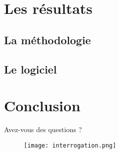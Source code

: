 \documentclass{beamer}
\begin{document}
\section{Les résultats} %
\subsection{La méthodologie}
\begin{frame}
\end{frame}

\subsection{Le logiciel}
\begin{frame}
\end{frame}

\section*{Conclusion} %
\begin{frame}
	
\end{frame}

\begin{frame}{Avez-vous des questions ?}
	\begin{figure}[H]
		\centering
		\texttt{[image: interrogation.png]}
	\end{figure}
\end{frame}
\end{document}
